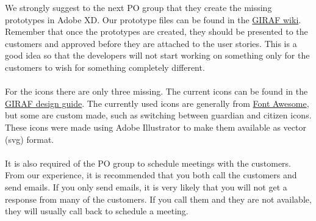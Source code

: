 \noindent
We strongly suggest to the next PO group that they create the missing prototypes in Adobe XD.
Our prototype files can be found in the \href{https://github.com/aau-giraf/wiki/tree/master/design_guide/prototypes}{GIRAF wiki}. 
Remember that once the prototypes are created, they should be presented to the customers and approved before they are attached to the user stories.
This is a good idea so that the developers will not start working on something only for the customers to wish for something completely different.
\\\\
For the icons there are only three missing. The current icons can be found in the \href{https://github.com/aau-giraf/wiki/blob/master/design_guide/icons.md}{GIRAF design guide}. 
The currently used icons are generally from \href{https://fontawesome.com/}{Font Awesome}, but some are custom made, such as switching between guardian and citizen icons.
These icons were made using Adobe Illustrator to make them available as vector (svg) format.
\\\\
It is also required of the PO group to schedule meetings with the customers.
From our experience, it is recommended that you both call the customers and send emails. 
If you only send emails, it is very likely that you will not get a response from many of the customers. 
If you call them and they are not available, they will usually call back to schedule a meeting.
